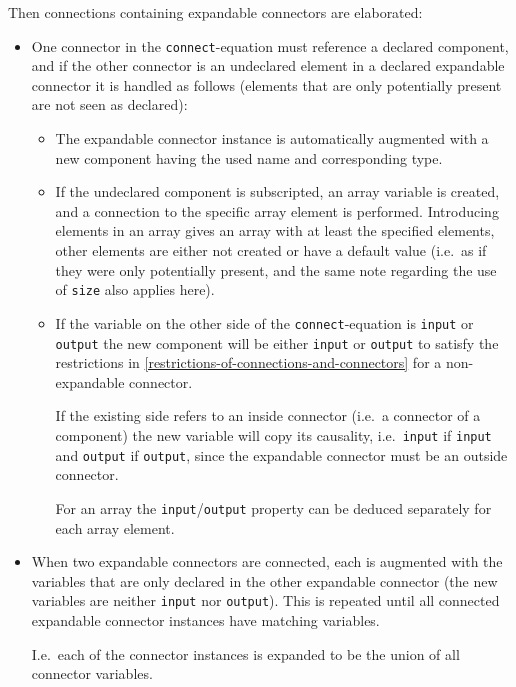 Then connections containing expandable connectors are elaborated:
\begin{itemize}
\item
  One connector in the \lstinline!connect!-equation must reference a declared component, and if the other connector is an undeclared element in a declared expandable connector it is handled as follows (elements that are only potentially present are not seen as declared):
  \begin{itemize}
  \item
    The expandable connector instance is automatically augmented with a new component having the used name and corresponding type.
  \item
    If the undeclared component is subscripted, an array variable is created, and a connection to the specific array element is performed.
    Introducing elements in an array gives an array with at least the specified elements, other elements are either not created or have a default value (i.e.\ as if they were only potentially present, and the same note regarding the use of \lstinline!size! also applies here).
  \item
    If the variable on the other side of the \lstinline!connect!-equation is \lstinline!input! or \lstinline!output! the new component will be either \lstinline!input! or \lstinline!output! to satisfy the restrictions in \cref{restrictions-of-connections-and-connectors} for a non-expandable connector.
    \begin{nonnormative}
    If the existing side refers to an inside connector (i.e.\ a connector of a component) the new variable will copy its causality, i.e.\ \lstinline!input! if \lstinline!input! and \lstinline!output! if \lstinline!output!, since the expandable connector must be an outside connector.
    \end{nonnormative}
    For an array the \lstinline!input!/\lstinline!output! property can be deduced separately for each array element.
  \end{itemize}

\item
  When two expandable connectors are connected, each is augmented with the variables that are only declared in the other expandable connector (the new variables are neither \lstinline!input! nor \lstinline!output!).
  This is repeated until all connected expandable connector instances have matching variables.
  \begin{nonnormative}
  I.e.\ each of the connector instances is expanded to be the union of all connector variables.
  \end{nonnormative}


\end{itemize}
